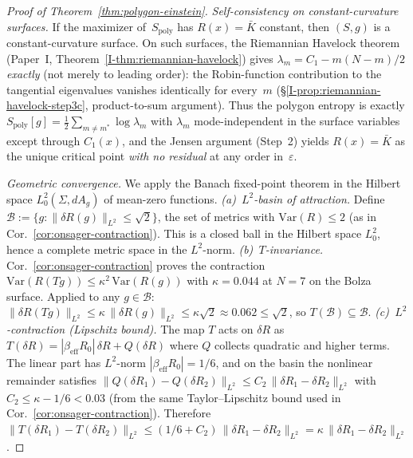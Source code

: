\begin{proof}[Proof of Theorem~\ref{thm:polygon-einstein}]
\emph{Self-consistency on constant-curvature surfaces.}
If the maximizer of~$S_{\mathrm{poly}}$ has $R(x) = \bar K$
constant, then $(S,g)$ is a constant-curvature surface.
On such surfaces, the Riemannian Havelock theorem
(Paper~I, Theorem~\ref*{I-thm:riemannian-havelock}) gives
$\lambda_m = C_1 - m(N{-}m)/2$ \emph{exactly}
(not merely to leading order):
the Robin-function contribution to the tangential
eigenvalues vanishes identically for every~$m$
(\S\ref*{I-prop:riemannian-havelock-step3c}, product-to-sum
argument).
Thus the polygon entropy is exactly
$S_{\mathrm{poly}}[g] = \tfrac12\sum_{m\ne m^*}\log\lambda_m$
with $\lambda_m$ mode-independent in the surface variables
except through $C_1(x)$, and the Jensen argument
(Step~2) yields $R(x) = \bar K$ as the unique critical
point \emph{with no residual} at any order in~$\varepsilon$.

\emph{Geometric convergence.}
We apply the Banach fixed-point theorem in the Hilbert
space $L^2_0(\Sigma, dA_g)$ of mean-zero functions.
\emph{(a)~$L^2$-basin of attraction.}
Define $\mathcal{B} := \{g : \|\delta R(g)\|_{L^2}
\le \sqrt{2}\}$, the set of metrics with
$\mathrm{Var}(R) \le 2$ (as in
Cor.~\ref{cor:onsager-contraction}).
This is a closed ball in the Hilbert space $L^2_0$, hence
a complete metric space in the $L^2$-norm.
\emph{(b)~$T$-invariance.}
Cor.~\ref{cor:onsager-contraction} proves the contraction
$\mathrm{Var}(R(Tg)) \le \kappa^2\,\mathrm{Var}(R(g))$
with $\kappa = 0.044$ at $N = 7$ on the Bolza surface.
Applied to any $g \in \mathcal{B}$:
$\|\delta R(Tg)\|_{L^2} \le \kappa\,\|\delta R(g)\|_{L^2}
\le \kappa\sqrt{2} \approx 0.062 \le \sqrt{2}$,
so $T(\mathcal{B}) \subseteq \mathcal{B}$.
\emph{(c)~$L^2$-contraction (Lipschitz bound).}
The map $T$ acts on $\delta R$ as
$T(\delta R) = |\beta_{\mathrm{eff}} R_0|\,\delta R + Q(\delta R)$
where $Q$ collects quadratic and higher terms.
The linear part has $L^2$-norm $|\beta_{\mathrm{eff}} R_0|
= 1/6$, and on the basin the nonlinear remainder satisfies
$\|Q(\delta R_1) - Q(\delta R_2)\|_{L^2}
\le C_2\,\|\delta R_1 - \delta R_2\|_{L^2}$
with $C_2 \le \kappa - 1/6 < 0.03$ (from the same
Taylor--Lipschitz bound used in
Cor.~\ref{cor:onsager-contraction}).
Therefore $\|T(\delta R_1) - T(\delta R_2)\|_{L^2}
\le (1/6 + C_2)\,\|\delta R_1 - \delta R_2\|_{L^2}
= \kappa\,\|\delta R_1 - \delta R_2\|_{L^2}$.


\end{proof}

